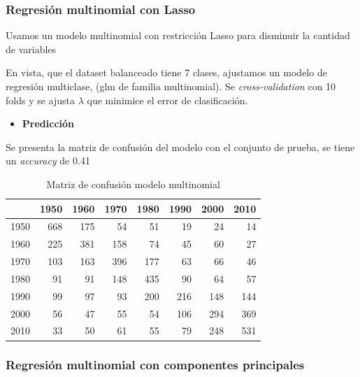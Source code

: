 \documentclass[conference,final,]{IEEEtran}
\providecommand{\tightlist}{%
  \setlength{\itemsep}{0pt}\setlength{\parskip}{0pt}}
\begin{document}
\hypertarget{regresion-multinomial-con-lasso}{%
\subsubsection{Regresión multinomial con
Lasso}\label{regresion-multinomial-con-lasso}}

Usamos un modelo multinomial con restricción Lasso para disminuir la
cantidad de variables

En vista, que el dataset balanceado tiene 7 clases, ajustamos un modelo
de regresión multiclase, (glm de familia multinomial). Se
\emph{cross-validation} con 10 folds y se ajusta \(\lambda\) que
minimice el error de clasificación.

\begin{itemize}
\tightlist
\item
  \textbf{Predicción}
\end{itemize}

Se presenta la matriz de confusión del modelo con el conjunto de prueba,
se tiene un \emph{accuracy} de 0.41

\begin{table}[!t]
\centering
\caption{Matriz de confusión modelo multinomial} 
\begin{tabular}{r|rrrrrrr}
  \hline
 & 1950 & 1960 & 1970 & 1980 & 1990 & 2000 & 2010 \\ 
  \hline
1950 & 668 & 175 &  54 &  51 &  19 &  24 &  14 \\ 
  1960 & 225 & 381 & 158 &  74 &  45 &  60 &  27 \\ 
  1970 & 103 & 163 & 396 & 177 &  63 &  66 &  46 \\ 
  1980 &  91 &  91 & 148 & 435 &  90 &  64 &  57 \\ 
  1990 &  99 &  97 &  93 & 200 & 216 & 148 & 144 \\ 
  2000 &  56 &  47 &  55 &  54 & 106 & 294 & 369 \\ 
  2010 &  33 &  50 &  61 &  55 &  79 & 248 & 531 \\ 
   \hline
\end{tabular}
\end{table}

\hypertarget{regresion-multinomial-con-componentes-principales}{%
\subsubsection{Regresión multinomial con componentes
principales}\label{regresion-multinomial-con-componentes-principales}}
\end{document}

